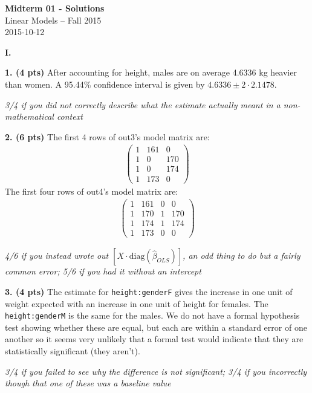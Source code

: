 \documentclass[12pt]{article}
\begin{document}
\begin{center}
{\bf Midterm 01 - Solutions} \\
Linear Models -- Fall 2015 \\
2015-10-12
\end{center}

\medskip

{\bf I.}

{\bf 1. (4 pts)} After accounting for height, males are on average 4.6336 kg heavier than women.
A 95.44\% confidence interval is given by $4.6336 \pm 2 \cdot 2.1478$.

{\it 3/4 if you did not correctly describe what the estimate actually meant in a non-mathematical
context}

{\bf 2. (6 pts)} The first 4 rows of out3's model matrix are:
\begin{align*}
\left(\begin{array}{ccc}
1 & 161 & 0 \\
1 & 0 & 170 \\
1 & 0 & 174 \\
1 & 173 & 0
\end{array}\right)
\end{align*}
The first four rows of out4's model matrix are:
\begin{align*}
\left(\begin{array}{cccc}
1 & 161 & 0 & 0 \\
1 & 170 & 1 & 170 \\
1 & 174 & 1 & 174 \\
1 & 173 & 0 & 0
\end{array}\right)
\end{align*}

{\it 4/6 if you instead wrote out $\left[ X \cdot \text{diag}(\widehat{\beta}_{OLS}) \right]$,
an odd thing to do but a fairly common error; 5/6 if you had it without an intercept}

{\bf 3. (4 pts)} The estimate for \texttt{height:genderF} gives the increase in one unit of
weight expected with an increase in one unit of height for females. The \texttt{height:genderM}
is the same for the males. We do not have a formal hypothesis test showing whether these
are equal, but each are within a standard error of one another so it seems very
unlikely that a formal test would indicate that they are statistically significant (they aren't).

{\it 3/4 if you failed to see why the difference is not significant; 3/4 if you
incorrectly though that one of these was a baseline value}
\end{document}
